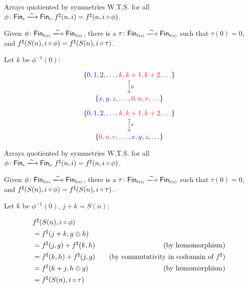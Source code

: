 \documentclass[9pt]{beamer}
\begin{document}
\begin{frame}[fragile]{Arrays quotiented by symmetries}
    W.T.S. for all $\phi\colon \Fin[n]\xto{\sim}\Fin[n]. \, \ext{f}(n, i) = \ext{f}(n, i \circ \phi)$.

    \begin{tblock}
    Given $\phi\colon \Fin[S(n)]\xto{\sim}\Fin[S(n)]$, there is a $\tau\colon \Fin[S(n)]\xto{\sim}\Fin[S(n)]$
    such that $\tau(0) = 0$, and ${f}^{\sharp}(S(n), i \circ \phi) = {f}^{\sharp}(S(n), i \circ \tau)$.

    Let $k$ be $\phi^{-1}(0)$:

    \[\begin{tikzcd}[ampersand replacement=\&,cramped]
    	{\{\color{blue}0, 1, 2, \dots, \color{red}k, k+1, k+2, \dots \color{black}\}} \\
    	{ \{\color{blue}x, y, z, \dots, \color{red}0, u, v, \dots \color{black}\}}
        \arrow["\phi", maps to, from=1-1, to=2-1]
    \end{tikzcd}\]

    \[\begin{tikzcd}[ampersand replacement=\&,cramped]
    	{\{\color{blue}0, 1, 2, \dots, \color{red}k, k+1, k+2, \dots \color{black}\}} \\
    	{ \{\color{red}0, u, v, \dots, \color{blue}x, y, z, \dots \color{black}\}}
        \arrow["\tau", maps to, from=1-1, to=2-1]
    \end{tikzcd}\]
    
    \end{tblock}
    
\end{frame}

\begin{frame}[fragile]{Arrays quotiented by symmetries}
    W.T.S. for all $\phi\colon \Fin[n]\xto{\sim}\Fin[n]. \, \ext{f}(n, i) = \ext{f}(n, i \circ \phi)$.

    \begin{tblock}
    Given $\phi\colon \Fin[S(n)]\xto{\sim}\Fin[S(n)]$, there is a $\tau\colon \Fin[S(n)]\xto{\sim}\Fin[S(n)]$
    such that $\tau(0) = 0$, and ${f}^{\sharp}(S(n), i \circ \phi) = {f}^{\sharp}(S(n), i \circ \tau)$.

    Let $k$ be $\phi^{-1}(0)$, $j + k = S(n)$:
    
    \begin{align*}
        & {f}^{\sharp}(S(n), i \circ \phi) \\
        & = {f}^{\sharp}(j + k, g \oplus h) \\
        & = {f}^{\sharp}(j, g) + {f}^{\sharp}(k, h) & \quad \text{(by homomorphism)} \\
        & = {f}^{\sharp}(k, h) + {f}^{\sharp}(j, g) & \quad \text{(by commutativity in codomain of ${f}^{\sharp}$)}\\
        & = {f}^{\sharp}(k + j, h \oplus g)    & \quad \text{(by homomorphism)} \\
        & = {f}^{\sharp}(S(n), i \circ \tau)
    \end{align*}
    
    \end{tblock}
    
\end{frame}
\end{document}
